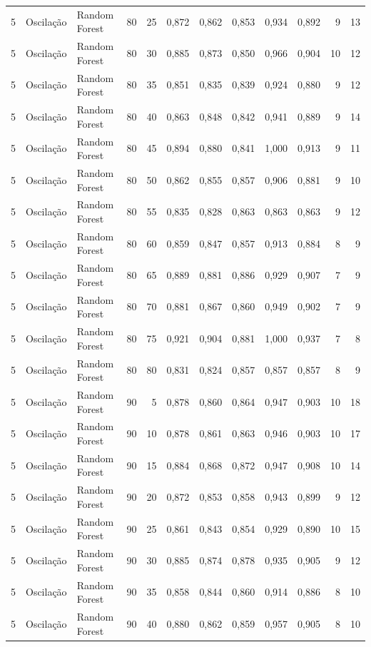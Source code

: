 \begin{longtable}{@{}rllrrrrrrrrr@{}}
5 & Oscilação & Random Forest & 80 & 25 & 0,872 & 0,862 & 0,853 & 0,934 & 0,892 & 9 & 13 \\
5 & Oscilação & Random Forest & 80 & 30 & 0,885 & 0,873 & 0,850 & 0,966 & 0,904 & 10 & 12 \\
5 & Oscilação & Random Forest & 80 & 35 & 0,851 & 0,835 & 0,839 & 0,924 & 0,880 & 9 & 12 \\
5 & Oscilação & Random Forest & 80 & 40 & 0,863 & 0,848 & 0,842 & 0,941 & 0,889 & 9 & 14 \\
5 & Oscilação & Random Forest & 80 & 45 & 0,894 & 0,880 & 0,841 & 1,000 & 0,913 & 9 & 11 \\
5 & Oscilação & Random Forest & 80 & 50 & 0,862 & 0,855 & 0,857 & 0,906 & 0,881 & 9 & 10 \\
5 & Oscilação & Random Forest & 80 & 55 & 0,835 & 0,828 & 0,863 & 0,863 & 0,863 & 9 & 12 \\
5 & Oscilação & Random Forest & 80 & 60 & 0,859 & 0,847 & 0,857 & 0,913 & 0,884 & 8 & 9 \\
5 & Oscilação & Random Forest & 80 & 65 & 0,889 & 0,881 & 0,886 & 0,929 & 0,907 & 7 & 9 \\
5 & Oscilação & Random Forest & 80 & 70 & 0,881 & 0,867 & 0,860 & 0,949 & 0,902 & 7 & 9 \\
5 & Oscilação & Random Forest & 80 & 75 & 0,921 & 0,904 & 0,881 & 1,000 & 0,937 & 7 & 8 \\
5 & Oscilação & Random Forest & 80 & 80 & 0,831 & 0,824 & 0,857 & 0,857 & 0,857 & 8 & 9 \\
5 & Oscilação & Random Forest & 90 & 5 & 0,878 & 0,860 & 0,864 & 0,947 & 0,903 & 10 & 18 \\
5 & Oscilação & Random Forest & 90 & 10 & 0,878 & 0,861 & 0,863 & 0,946 & 0,903 & 10 & 17 \\
5 & Oscilação & Random Forest & 90 & 15 & 0,884 & 0,868 & 0,872 & 0,947 & 0,908 & 10 & 14 \\
5 & Oscilação & Random Forest & 90 & 20 & 0,872 & 0,853 & 0,858 & 0,943 & 0,899 & 9 & 12 \\
5 & Oscilação & Random Forest & 90 & 25 & 0,861 & 0,843 & 0,854 & 0,929 & 0,890 & 10 & 15 \\
5 & Oscilação & Random Forest & 90 & 30 & 0,885 & 0,874 & 0,878 & 0,935 & 0,905 & 9 & 12 \\
5 & Oscilação & Random Forest & 90 & 35 & 0,858 & 0,844 & 0,860 & 0,914 & 0,886 & 8 & 10 \\
5 & Oscilação & Random Forest & 90 & 40 & 0,880 & 0,862 & 0,859 & 0,957 & 0,905 & 8 & 10 \\

\end{longtable}
